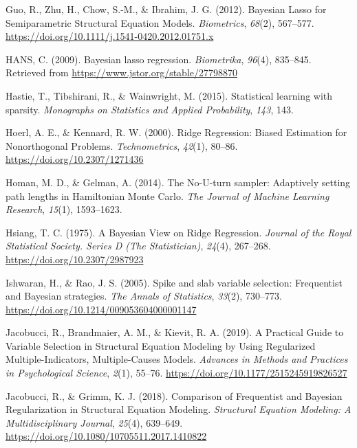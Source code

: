 \documentclass[
  english,
  man, donotrepeattitle,floatsintext]{apa6}
\newlength{\cslhangindent}
\newlength{\cslentryspacingunit} %
\newenvironment{CSLReferences}[2] %
 {%
  \setlength{\parindent}{0pt}
  \ifodd #1
  \let\oldpar\par
  \def\par{\hangindent=\cslhangindent\oldpar}
  \fi
  \setlength{\parskip}{#2\cslentryspacingunit}
 }%
 {}
\begin{document}
\begin{CSLReferences}{1}{0}
\leavevmode{}%
Guo, R., Zhu, H., Chow, S.-M., \& Ibrahim, J. G. (2012). Bayesian {Lasso} for {Semiparametric} {Structural} {Equation} {Models}. \emph{Biometrics}, \emph{68}(2), 567--577. \url{https://doi.org/10.1111/j.1541-0420.2012.01751.x}

\leavevmode{}%
HANS, C. (2009). Bayesian lasso regression. \emph{Biometrika}, \emph{96}(4), 835--845. Retrieved from \url{https://www.jstor.org/stable/27798870}

\leavevmode{}%
Hastie, T., Tibshirani, R., \& Wainwright, M. (2015). Statistical learning with sparsity. \emph{Monographs on Statistics and Applied Probability}, \emph{143}, 143.

\leavevmode{}%
Hoerl, A. E., \& Kennard, R. W. (2000). Ridge {Regression}: {Biased} {Estimation} for {Nonorthogonal} {Problems}. \emph{Technometrics}, \emph{42}(1), 80--86. \url{https://doi.org/10.2307/1271436}

\leavevmode{}%
Homan, M. D., \& Gelman, A. (2014). The {No}-{U}-turn sampler: Adaptively setting path lengths in {Hamiltonian} {Monte} {Carlo}. \emph{The Journal of Machine Learning Research}, \emph{15}(1), 1593--1623.

\leavevmode{}%
Hsiang, T. C. (1975). A {Bayesian} {View} on {Ridge} {Regression}. \emph{Journal of the Royal Statistical Society. Series D (The Statistician)}, \emph{24}(4), 267--268. \url{https://doi.org/10.2307/2987923}

\leavevmode{}%
Ishwaran, H., \& Rao, J. S. (2005). Spike and slab variable selection: {Frequentist} and {Bayesian} strategies. \emph{The Annals of Statistics}, \emph{33}(2), 730--773. \url{https://doi.org/10.1214/009053604000001147}

\leavevmode{}%
Jacobucci, R., Brandmaier, A. M., \& Kievit, R. A. (2019). A {Practical} {Guide} to {Variable} {Selection} in {Structural} {Equation} {Modeling} by {Using} {Regularized} {Multiple}-{Indicators}, {Multiple}-{Causes} {Models}. \emph{Advances in Methods and Practices in Psychological Science}, \emph{2}(1), 55--76. \url{https://doi.org/10.1177/2515245919826527}

\leavevmode{}%
Jacobucci, R., \& Grimm, K. J. (2018). Comparison of {Frequentist} and {Bayesian} {Regularization} in {Structural} {Equation} {Modeling}. \emph{Structural Equation Modeling: A Multidisciplinary Journal}, \emph{25}(4), 639--649. \url{https://doi.org/10.1080/10705511.2017.1410822}


\end{CSLReferences}
\end{document}
